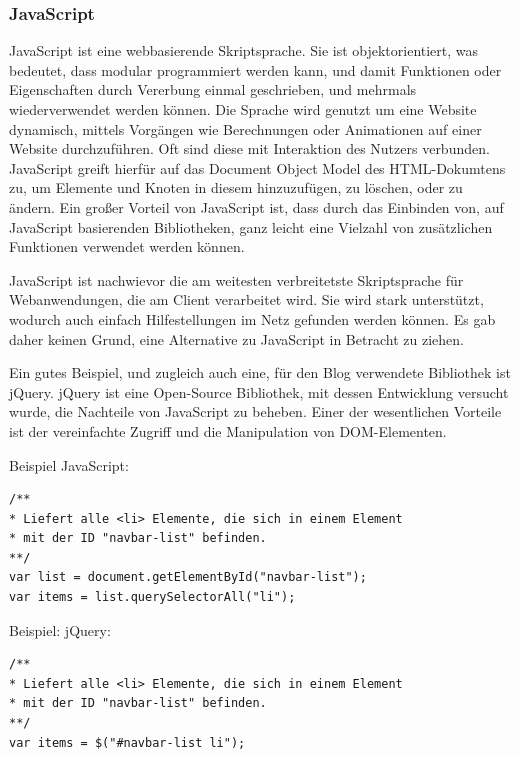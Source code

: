      \subsubsection*{JavaScript}
      {JavaScript\cite{javascript}} ist eine webbasierende Skriptsprache. Sie ist objektorientiert, was bedeutet, dass modular programmiert werden kann, und damit Funktionen oder Eigenschaften
      durch Vererbung einmal geschrieben, und mehrmals wiederverwendet werden können. Die Sprache wird genutzt um eine Website dynamisch, mittels Vorgängen wie Berechnungen oder Animationen auf einer Website durchzuführen.
      Oft sind diese mit Interaktion des Nutzers verbunden. JavaScript greift hierfür auf das Document Object Model des HTML-Dokumtens zu, um Elemente und Knoten in diesem hinzuzufügen, zu löschen, oder
      zu ändern. Ein großer Vorteil von JavaScript ist, dass durch das Einbinden von, auf JavaScript basierenden Bibliotheken, ganz leicht eine Vielzahl von zusätzlichen Funktionen
      verwendet werden können.

      JavaScript ist nachwievor die am weitesten verbreitetste Skriptsprache für Webanwendungen, die am Client verarbeitet wird. Sie wird stark unterstützt, wodurch auch einfach Hilfestellungen im Netz
      gefunden werden können. Es gab daher keinen Grund, eine Alternative zu JavaScript in Betracht zu ziehen.

      Ein gutes Beispiel, und zugleich auch eine, für den Blog verwendete Bibliothek ist {jQuery\cite{jquery}}.
      jQuery ist eine Open-Source Bibliothek, mit dessen Entwicklung versucht wurde, die Nachteile von JavaScript zu beheben. Einer der wesentlichen Vorteile ist
      der vereinfachte Zugriff und die Manipulation von DOM-Elementen.

      Beispiel JavaScript:

\lstset{language= html }
\begin{lstlisting}
/**
* Liefert alle <li> Elemente, die sich in einem Element
* mit der ID "navbar-list" befinden.
**/
var list = document.getElementById("navbar-list");
var items = list.querySelectorAll("li");
\end{lstlisting}

      Beispiel: jQuery:

\lstset{ language=html }
\begin{lstlisting}
/**
* Liefert alle <li> Elemente, die sich in einem Element
* mit der ID "navbar-list" befinden.
**/
var items = $("#navbar-list li");
\end{lstlisting}

